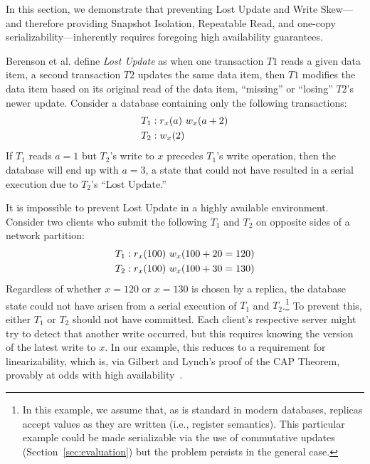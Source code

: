 In this section, we demonstrate that preventing Lost Update and Write
Skew---and therefore providing Snapshot Isolation, Repeatable Read,
and one-copy serializability---inherently requires foregoing high
availability guarantees.

Berenson et al. define \textit{Lost Update} as when one
transaction $T1$ reads a given data item, a second transaction $T2$
updates the same data item, then $T1$ modifies the data item based on
its original read of the data item, ``missing'' or ``losing'' $T2$'s
newer update. Consider a database containing only the following
transactions:
\begin{align*}
\small\vspace{-1em}
T_1 &: r_x(a)~w_x(a+2)
\\T_2 &: w_x(2)\vspace{-1em}
\end{align*}
If $T_1$ reads $a=1$ but $T_2$'s write to $x$ precedes $T_1$'s write
operation, then the database will end up with $a=3$, a state that
could not have resulted in a serial execution due to $T_2$'s
``Lost Update.''

It is impossible to prevent Lost Update in a highly available
environment. Consider two clients who submit the following $T_1$ and
$T_2$ on opposite sides of a network partition:
\begin{align*}
\small\vspace{-1em}
T_1 &: r_x(100)~w_x(100+20=120)
\\T_2 &: r_x(100)~w_x(100+30=130)\vspace{-1em}
\end{align*}
Regardless of whether $x=120$ or $x=130$ is chosen by a replica, the
database state could not have arisen from a serial execution of $T_1$ and
$T_2$.\footnote{In this example, we assume that, as is standard in
  modern databases, replicas accept values as they are written (i.e.,
  register semantics). This particular example could be made
  serializable via the use of commutative updates
  (Section~\ref{sec:evaluation}) but the problem persists in the
  general case.}  To prevent this, either $T_1$ or
$T_2$ should not have committed. Each client's respective server might
try to detect that another write occurred, but this requires knowing
the version of the latest write to $x$. In our example, this reduces
to a requirement for linearizability, which is, via Gilbert and
Lynch's proof of the CAP Theorem, provably at odds with high
availability~\cite{gilbert-cap}.

